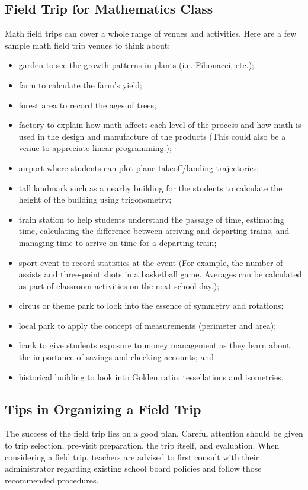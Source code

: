 \subsection*{Field Trip for Mathematics Class}
Math field trips can cover a whole range of venues and activities. Here are a few sample math
field trip venues to think about:
\begin{itemize}
\item garden to see the growth patterns in plants (i.e. Fibonacci, etc.);
\item  farm to calculate the farm's yield;
\item  forest area to record the ages of trees;
\item  factory to explain how math affects each level of the process and how math is used in the design
and manufacture of the products (This could also be a venue to appreciate linear
programming.);
\item  airport where students can plot plane takeoff/landing trajectories;
\item  tall landmark such as a nearby building for the students to calculate the height of the building
using trigonometry;
\item 
train station to help students understand the passage of time, estimating time, calculating the
difference between arriving and departing trains, and managing time to arrive on time for a
departing train;
\item 
sport event to record statistics at the event (For example, the number of assists and three-point
shots in a basketball game. Averages can be calculated as part of classroom activities on the
next school day.);
\item  circus or theme park to look into the essence of symmetry and rotations;
\item  local park to apply the concept of measurements (perimeter and area);
\item  bank to give students exposure to money management as they learn about the importance of
savings and checking accounts; and
\item 
historical building to look into Golden ratio, tessellations and isometries.
\end{itemize}
\subsection*{Tips in Organizing a Field Trip}
The success of the field trip lies on a good plan. Careful attention should be given to trip
selection, pre-visit preparation, the trip itself, and evaluation. When considering a field trip, teachers are
advised to first consult with their administrator regarding existing school board policies and follow those
recommended procedures.

